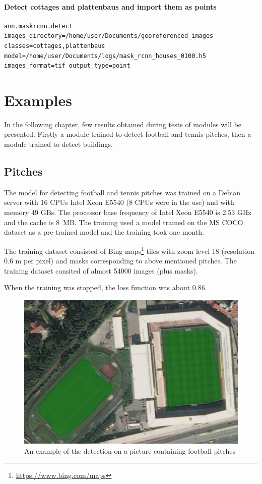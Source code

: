 \subsubsection*{Detect cottages and plattenbaus and import them as points}

{\footnotesize
\begin{lstlisting}[breaklines=true]
ann.maskrcnn.detect images_directory=/home/user/Documents/georeferenced_images classes=cottages,plattenbaus model=/home/user/Documents/logs/mask_rcnn_houses_0100.h5 images_format=tif output_type=point
\end{lstlisting}
}

\chapter{Examples}
\label{examples}

In the following chapter, few results obtained during tests of modules will be
presented. Firstly a module trained to detect football and tennis pitches, then 
a module trained to detect buildings.

\section{Pitches}

The model for detecting football and tennis pitches was trained on a Debian 
server with 16 CPUs Intel Xeon E5540 (8 CPUs were in the use) and with memory 49 
GBs. The processor base frequency of Intel Xeon E5540 is 2.53 GHz and the cache 
is 8~MB. The training used a model trained on the MS COCO dataset as a 
pre-trained model and the training took one month.

The training dataset consisted of Bing 
maps\footnote{\url{https://www.bing.com/maps}} tiles with zoom level 18 
(resolution 0.6 m per pixel) and masks corresponding to above mentioned pitches. 
The training dataset consited of almost 54000 images (plus masks).

When the training was stopped, the loss function was about 0.86.

\begin{figure}[H]
   \centering
	\includegraphics[width=.8\linewidth]{./pictures/out1.png}
	\caption[Detection of football pitches]{An example of the detection on a picture containing football pitches}
      \label{fig:football}
\end{figure}

